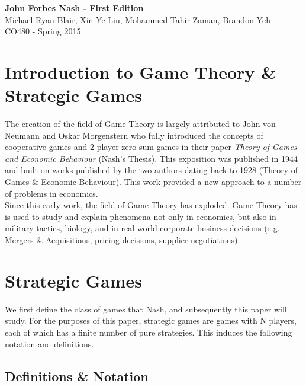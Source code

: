 \documentclass[12pt]{article}
\begin{document}
	
	\begin{center}
		\vspace*{3cm}	
		\textbf{\LARGE John Forbes Nash - First Edition}\\
		\vspace{5pt}
		\large Michael Ryan Blair, Xin Ye Liu, Mohammed Tahir Zaman, Brandon Yeh\\
		\vspace{5pt}
		CO480 - Spring 2015\\
	\end{center}
	
	\newpage
	
	\tableofcontents
	
	\newpage
	
	\singlespacing
	
	\section{Introduction to Game Theory \& Strategic Games}
	The creation of the field of Game Theory is largely attributed to John von Neumann and Oskar Morgenstern who fully introduced the concepts of cooperative games and 2-player zero-sum games in their paper \textit{Theory of Games and Economic Behaviour} (Nash’s Thesis). This exposition was published in 1944 and built on works published by the two authors dating back to 1928 (Theory of Games \& Economic Behaviour). This work provided a new approach to a number of problems in economics. \\
	
	Since this early work, the field of Game Theory has exploded. Game Theory has is used to study and explain phenomena not only in economics, but also in military tactics, biology, and in real-world corporate business decisions (e.g. Mergers \& Acquisitions, pricing decisions, supplier negotiations).
	
	\section{Strategic Games}
	
	We first define the class of games that Nash, and subsequently this paper will study. For the purposes of this paper, strategic games are games with N players, each of which has a finite number of pure strategies. This induces the following notation and definitions.
	
	\subsection{Definitions \& Notation}
	
\end{document}
